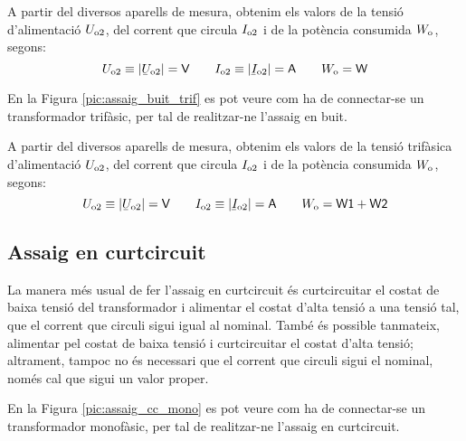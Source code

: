 A partir del diversos aparells de mesura, obtenim els valors de la
tensió d'alimentació $U_\mathrm{o2}$, del corrent que circula
$I_\mathrm{o2}$ i de la potència consumida $W_\mathrm{o}$, segons:
\begin{equation}
    U\ped{o2}\equiv|\cmplx{U}\ped{o2}|=\textsf{V} \qquad
    I\ped{o2}\equiv|\cmplx{I}\ped{o2}|=\textsf{A}
    \qquad W\ped{o}=\textsf{W}
\end{equation}

En la Figura \vref{pic:assaig_buit_trif} es pot veure com ha de
connectar-se un transformador trifàsic, per tal de realitzar-ne l'assaig en buit.

\begin{center}
    
    \label{pic:assaig_buit_trif}
\end{center}


A partir del diversos aparells de mesura, obtenim els valors de la
tensió trifàsica d'alimentació $U_\mathrm{o2}$, del corrent que circula
$I_\mathrm{o2}$ i de la potència consumida $W_\mathrm{o}$, segons:
\begin{equation}
    U\ped{o2}\equiv|\cmplx{U}\ped{o2}|=\textsf{V} \qquad
    I\ped{o2}\equiv|\cmplx{I}\ped{o2}|=\textsf{A} \qquad
    W\ped{o}=\textsf{W1}+\textsf{W2}
\end{equation}

\subsection{Assaig en curtcircuit}

La manera més usual de fer l'assaig en curtcircuit és
curtcircuitar el costat de baixa tensió del transformador i
alimentar el costat d'alta tensió a  una tensió tal, que el corrent
que circuli sigui igual al nominal. També és possible tanmateix,
alimentar pel costat de baixa tensió i curtcircuitar el costat
d'alta tensió; altrament, tampoc no és necessari que el corrent
que circuli sigui el nominal, només cal que sigui un valor proper.

En la Figura \vref{pic:assaig_cc_mono} es pot veure com ha de
connectar-se un transformador monofàsic, per tal de realitzar-ne l'assaig en curtcircuit.

\break
\begin{center}
    
    \label{pic:assaig_cc_mono} \
\end{center}

